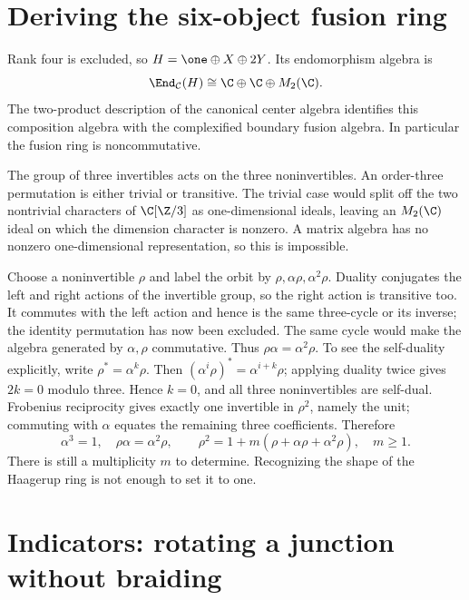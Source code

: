 \section{Deriving the six-object fusion ring}

Rank four is excluded, so
$H=\one\oplus X\oplus2Y$. Its endomorphism algebra is
\[
 \End_{\mathcal C}(H)\cong\C\oplus\C\oplus M_2(\C).
\]
The two-product description of the canonical center algebra identifies
this composition algebra with the complexified boundary fusion algebra.
In particular the fusion ring is noncommutative.

The group of three invertibles acts on the three noninvertibles. An
order-three permutation is either trivial or transitive. The trivial
case would split off the two nontrivial characters of $\C[\Z/3]$
as one-dimensional ideals, leaving an $M_2(\C)$ ideal on which the
dimension character is nonzero. A matrix algebra has no nonzero
one-dimensional representation, so this is impossible.

Choose a noninvertible $\rho$ and label the orbit by
$\rho,\alpha\rho,\alpha^2\rho$. Duality conjugates the left and
right actions of the invertible group, so the right action is
transitive too. It commutes with the left action and hence is the
same three-cycle or its inverse; the identity permutation has now
been excluded. The same cycle
would make the algebra generated by $\alpha,\rho$ commutative. Thus
$\rho\alpha=\alpha^2\rho$. To see the self-duality explicitly, write
$\rho^*=\alpha^k\rho$. Then
$(\alpha^i\rho)^*=\alpha^{i+k}\rho$; applying duality twice gives
$2k=0$ modulo three. Hence $k=0$, and all three noninvertibles
are self-dual. Frobenius reciprocity gives exactly one invertible in
$\rho^2$, namely the unit; commuting with $\alpha$ equates the remaining
three coefficients. Therefore
\begin{equation}\label{eq:c-HI-m}
 \alpha^3=1,\quad\rho\alpha=\alpha^2\rho,
 \qquad\rho^2=1+m(\rho+\alpha\rho+\alpha^2\rho),\quad m\geq1.
\end{equation}
There is still a multiplicity $m$ to determine. Recognizing the shape
of the Haagerup ring is not enough to set it to one.

\section{Indicators: rotating a junction without braiding}
\label{sec:c-indicator-bridge}


